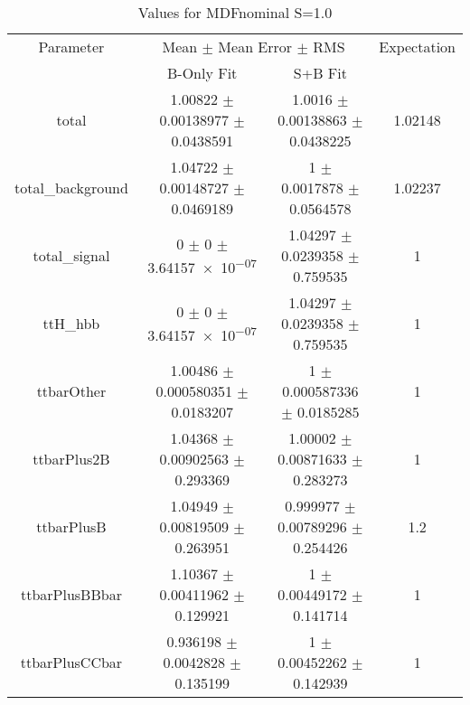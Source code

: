 \begin{table}
\centering
\caption{Values for MDFnominal S=1.0}
\begin{tabular}{cccc}
\toprule
Parameter & \multicolumn{2}{c}{Mean $\pm$ Mean Error $\pm$ RMS} & Expectation\\
 & B-Only Fit & S+B Fit & \\
\midrule
total & \num{1.00822} $\pm$ \num{0.00138977} $\pm$ \num{0.0438591} & \num{1.0016} $\pm$ \num{0.00138863} $\pm$ \num{0.0438225} & \num{1.02148}\\
total\_background & \num{1.04722} $\pm$ \num{0.00148727} $\pm$ \num{0.0469189} & \num{1} $\pm$ \num{0.0017878} $\pm$ \num{0.0564578} & \num{1.02237}\\
total\_signal & \num{0} $\pm$ \num{0} $\pm$ \num{3.64157e-07} & \num{1.04297} $\pm$ \num{0.0239358} $\pm$ \num{0.759535} & \num{1}\\
ttH\_hbb & \num{0} $\pm$ \num{0} $\pm$ \num{3.64157e-07} & \num{1.04297} $\pm$ \num{0.0239358} $\pm$ \num{0.759535} & \num{1}\\
ttbarOther & \num{1.00486} $\pm$ \num{0.000580351} $\pm$ \num{0.0183207} & \num{1} $\pm$ \num{0.000587336} $\pm$ \num{0.0185285} & \num{1}\\
ttbarPlus2B & \num{1.04368} $\pm$ \num{0.00902563} $\pm$ \num{0.293369} & \num{1.00002} $\pm$ \num{0.00871633} $\pm$ \num{0.283273} & \num{1}\\
ttbarPlusB & \num{1.04949} $\pm$ \num{0.00819509} $\pm$ \num{0.263951} & \num{0.999977} $\pm$ \num{0.00789296} $\pm$ \num{0.254426} & \num{1.2}\\
ttbarPlusBBbar & \num{1.10367} $\pm$ \num{0.00411962} $\pm$ \num{0.129921} & \num{1} $\pm$ \num{0.00449172} $\pm$ \num{0.141714} & \num{1}\\
ttbarPlusCCbar & \num{0.936198} $\pm$ \num{0.0042828} $\pm$ \num{0.135199} & \num{1} $\pm$ \num{0.00452262} $\pm$ \num{0.142939} & \num{1}\\
\bottomrule
\end{tabular}
\end{table}